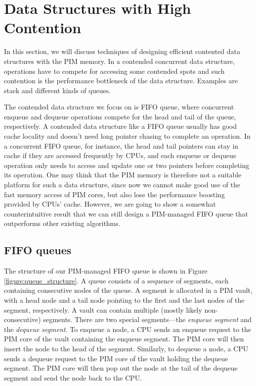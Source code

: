 
\section{Data Structures with High Contention}
\label{section:contended}
In this section, we will discuss techniques of designing efficient contented data structures 
with the PIM memory.
In a contended concurrent data structure, operations have to compete for accessing some 
contended spots and such contention is the performance bottleneck of the data structure.
Examples are stack and different kinds of queues.

The contended data structure we focus on is FIFO queue, where concurrent enqueue
and dequeue operations compete for the head and tail of the queue, respectively.
A contended data structure like a FIFO queue usually has good cache locality
and doesn't need long pointer chasing to complete an operation.
In a concurrent FIFO queue, for instance, the head and tail pointers can stay in
cache if they are accessed frequently by CPUs, and each enqueue or dequeue
operation only needs to access and update one or two pointers before completing its operation.
One may think that the PIM memory is therefore not a suitable platform for such a data structure,
since now we cannot make good use of the fast memory access of PIM cores, but also
lose the performance boosting provided by CPUs' cache.
However, we are going to show a somewhat counterintuitive result that we can still design
a PIM-managed FIFO queue that outperforms other existing algorithms.

\subsection{FIFO queues}
The structure of our PIM-managed FIFO queue is shown in Figure \ref{figure:queue_structure}.
A queue consists of a sequence of segments, each containing consecutive nodes of the queue.
A segment is allocated in a PIM vault, with a head node and a tail node pointing to the first 
and the last nodes of the segment, respectively.
A vault can contain multiple (mostly likely non-consecutive) segments. 
There are two special segments---the \textit{enqueue segment} and the \textit{dequeue segment}.
To enqueue a node, a CPU sends an enqueue request to the PIM core of the vault 
containing the enqueue segment.
The PIM core will then insert the node to the head of the segment.
Similarly, to dequeue a node, a CPU sends a dequeue request to the PIM core of the vault
holding the dequeue segment. 
The PIM core will then pop out the node at the tail of the dequeue segment and 
send the node back to the CPU.

